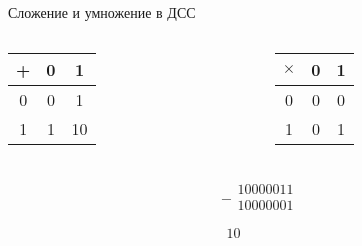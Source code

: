 \documentclass[hyperref=unicode, aspectratio=169]{beamer}
\begin{document}
\begin{frame}{Сложение и умножение в ДСС}
    \begin{columns}
        \begin{column}{0.5\textwidth}
            \begin{table}
                \begin{tabular}{c | c | c}
                    + & 0 & 1  \\
                    \hline
                    0 & 0 & 1  \\
                    \hline
                    1 & 1 & 10 \\
                \end{tabular}
            \end{table}
        \end{column}
        \begin{column}{0.5\textwidth}
            \begin{table}
                \begin{tabular}{c | c | c}
                    $\times$ & 0 & 1 \\
                    \hline
                    0        & 0 & 0 \\
                    \hline
                    1        & 0 & 1 \\
                \end{tabular}
            \end{table}
        \end{column}
    \end{columns}
    \begin{example}
        \begin{columns}
            \begin{column}{0.5\textwidth}
                \begin{gather*}
                    \begin{array}{r}
                        -
                        \begin{array}{r}
                            10000011 \\
                            10000001 \\
                        \end{array} \\
                        \hline
                        \begin{array}{r}
                            10
                        \end{array}
                    \end{array}

\end{gather*}
\end{column}
\end{columns}
\end{example}
\end{frame}
\end{document}
